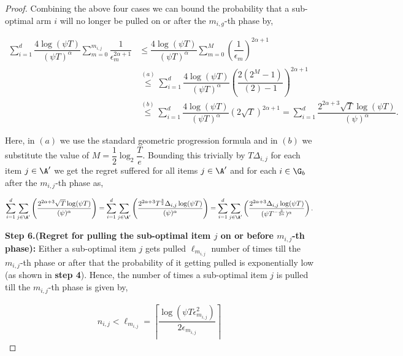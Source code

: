 \begin{proof}
Combining the above four cases we can bound the probability that a sub-optimal arm $i$ will no longer be pulled on or after the $m_{i,g}$-th phase by,

\begin{align*}
\sum_{i=1}^{d}\dfrac{4\log(\psi T )}{(\psi T)^{\alpha}}\sum_{m=0}^{m_{i,j}}\dfrac{1}{\epsilon_{m_{}}^{2\alpha +1}} &\leq \dfrac{4\log(\psi T )}{(\psi T)^{\alpha}}\sum_{m=0}^{M}\left(\dfrac{1}{\epsilon_{m}}\right)^{2\alpha +1}\\
& \overset{(a)}{\leq} \sum_{i=1}^{d}\dfrac{4\log(\psi T )}{(\psi T)^{\alpha}}\left(\dfrac{2(2^M - 1)}{(2) - 1}\right)^{2\alpha +1} \\
&\overset{(b)}{\leq} \sum_{i=1}^{d}\dfrac{4\log(\psi T )}{(\psi T)^{\alpha}}\left(2 \sqrt{T}\right)^{2\alpha +1} = \sum_{i=1}^{d}\dfrac{2^{2\alpha + 3}\sqrt{T}\log(\psi T )}{(\psi)^{\alpha}}.
\end{align*}

Here, in $(a)$ we use the standard geometric progression formula and  in $(b)$ we substitute the value of $M=\dfrac{1}{2}\log_{2}\dfrac{T}{e}$. Bounding this trivially by $T\Delta_{i,j}$ for each item $j\in\A'$ we get the regret suffered for all items $j\in\A'$ and for each $i\in\G_b$ after the $m_{i,j}$-th phase  as,

\begin{align*}
\sum_{i=1}^{d}\sum_{j\in\A'}\left( \dfrac{2^{2\alpha + 3}\sqrt{T}\log(\psi T )}{(\psi)^{\alpha}} \right) =  \sum_{i=1}^{d}\sum_{j\in\A'}\left( \dfrac{2^{2\alpha + 3}T^{\frac{3}{2}}\Delta_{i,j}\log(\psi T )}{(\psi)^{\alpha}} \right) =\sum_{i=1}^{d} \sum_{j\in\A'}\left( \dfrac{2^{2\alpha + 3}\Delta_{i,j}\log(\psi T )}{(\psi T^{-\frac{3}{2\alpha}})^{\alpha}} \right).
\end{align*}


\textbf{Step 6.(Regret for pulling the sub-optimal item $j$ on or before $m_{i,j}$-th phase):} Either a sub-optimal item $j$ gets pulled $\ell_{m_{i,j}}$ number of times till the $m_{i,j}$-th phase or after that the probability of it getting pulled is exponentially low (as shown in \textbf{step 4}). Hence, the number of times a sub-optimal item $j$ is pulled till the $m_{i,j}$-th phase is given by,

\begin{align*}
n_{i,j} < \ell_{m_{i,j}} = \left\lceil \dfrac{\log(\psi T\epsilon_{m_{i,j}}^2)}{2\epsilon_{m_{i,j}}} \right\rceil
\end{align*}


\end{proof}
